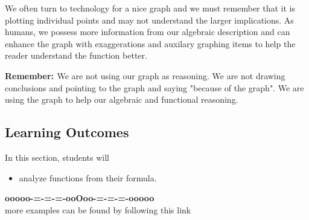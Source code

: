 \documentclass{ximera}
\begin{document}
We often turn to technology for a nice graph and we must remember that it is plotting individual points and may not understand the larger implications. As humans, we possess more information from our algebraic description and can enhance the graph with exaggerations and auxilary graphing items to help the reader understand the function better.





\textbf{\textcolor{red!70!black}{Remember: }}  We are not using our graph as reasoning.  We are not drawing conclusions and pointing to the graph and saying "because of the graph".  We are using the graph to help our algebraic and functional reasoning.


\subsection*{Learning Outcomes}


\begin{sectionOutcomes}
In this section, students will 

\begin{itemize}
\item analyze functions from their formula.
\end{itemize}
\end{sectionOutcomes}











\begin{center}
\textbf{\textcolor{green!50!black}{ooooo-=-=-=-ooOoo-=-=-=-ooooo}} \\

more examples can be found by following this link\\ 

\end{center}
\end{document}
